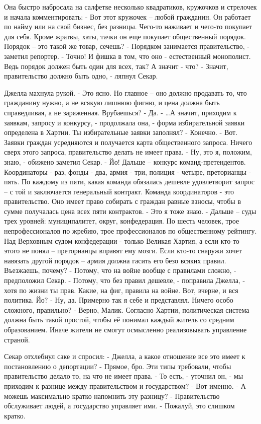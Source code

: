 \documentclass{book}
\begin{document}
Она быстро набросала на салфетке несколько квадратиков, кружочков и стрелочек и начала комментировать:
- Вот этот кружочек -- любой гражданин. Он работает по найму или на свой бизнес, без разницы. Чего-то наживает и чего-то покупает для себя. Кроме жратвы, хаты, тачки он еще покупает общественный порядок. Порядок -- это такой же товар, сечешь?
- Порядком занимается правительство, - заметил репортер.
- Точно! И фишка в том, что оно - естественный монополист. Ведь порядок должен быть один для всех, так? А значит - что?
- Значит, правительство должно быть одно, - ляпнул Секар.

Джелла махнула рукой.
- Это ясно. Но главное -- оно должно продавать то, что гражданину нужно, а не всякую лишнюю фигню, и цена должна быть справедливая, а не заряженная. Врубаешься?
- Да.
- \ldots{}А значит, приходим к заявкам, запросу и конкурсу, - продолжала она, - форма избирательной заявки определена в Хартии. Ты избирательные заявки заполнял?
- Конечно.
- Вот. Заявки граждан усредняются и получается карта общественного запроса. Ничего сверх этого запроса, правительство делать не имеет права.
- Ну, это я, положим, знаю, - обижено заметил Секар.
- Йо! Дальше -- конкурс команд-претендентов. Координаторы - раз, фонды - два, армия - три, полиция - четыре, преторианцы - пять. По каждому из пяти, какая команда обязалась дешевле удовлетворит запрос -- с той и заключается генеральный контракт. Команда координаторов - это правительство. Оно имеет право собирать с граждан равные взносы, чтобы в сумме получалась цена всех пяти контрактов.
- Это я тоже знаю.
- Дальше -- суды трех уровней: муниципалитет, округ, конфедерация. По шесть человек, трое непрофессионалов по жребию, трое профессионалов по общественному рейтингу. Над Верховным судом конфедерации - только Великая Хартия, а если кто-то этого не понял -- преторианцы вправят ему мозги. Если кто-то снаружи хочет навязать другой порядок -- армия должна гасить его безо всяких правил. Въезжаешь, почему?
- Потому, что на войне вообще с правилами сложно, - предположил Секар.
- Потому, что без правил дешевле, - поправила Джелла, - хотя по жизни ты прав. Какие, на фиг, правила на войне. Вот, вчерне, и вся политика. Йо?
- Ну, да. Примерно так я себе и представлял. Ничего особо сложного, правильно?
- Верно, Малик. Согласно Хартии, политическая система должна быть такой простой, чтобы её понимал каждый житель со средним образованием. Иначе жители не смогут осмысленно реализовывать управление страной.

Секар отхлебнул саке и спросил:
- Джелла, а какое отношение все это имеет к постановлению о депортации?
- Прямое, бро. Эти типы требовали, чтобы правительство делало то, на что не имеет права.
- То есть, - уточнил он, - мы приходим к разнице между правительством и государством?
- Вот именно.
- А можешь максимально кратко напомнить эту разницу?
- Правительство обслуживает людей, а государство управляет ими.
- Пожалуй, это слишком кратко.
\end{document}

